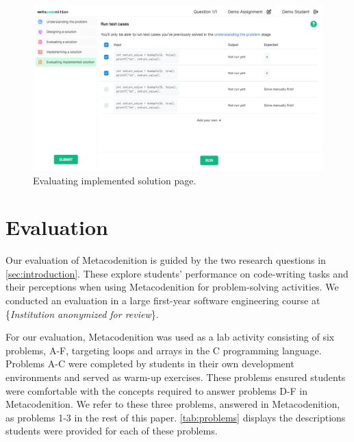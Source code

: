 \documentclass[sigconf,anonymous]{acmart}
\begin{document}
\begin{figure}[h!]
  \centering
  \includegraphics[width=\linewidth]{evaluating-implemented-solution}
  \caption{Evaluating implemented solution page.}
  \label{fig:evaluatingimplemented}
\end{figure}

\section{Evaluation} \label{sec:evaluation}
Our evaluation of Metacodenition is guided by the two research questions in \autoref{sec:introduction}. These explore students' performance on code-writing tasks and their perceptions when using Metacodenition for problem-solving activities. We conducted an evaluation in a large first-year software engineering course at \{\emph{Institution anonymized for review}\}.

For our evaluation, Metacodenition was used as a lab activity consisting of six problems, A-F, targeting loops and arrays in the C programming language. Problems A-C were completed by students in their own development environments and served as warm-up exercises. These problems ensured students were comfortable with the concepts required to answer problems D-F in Metacodenition. We refer to these three problems, answered in Metacodenition, as problems 1-3 in the rest of this paper. \autoref{tab:problems} displays the descriptions students were provided  for each of these problems.
\end{document}
